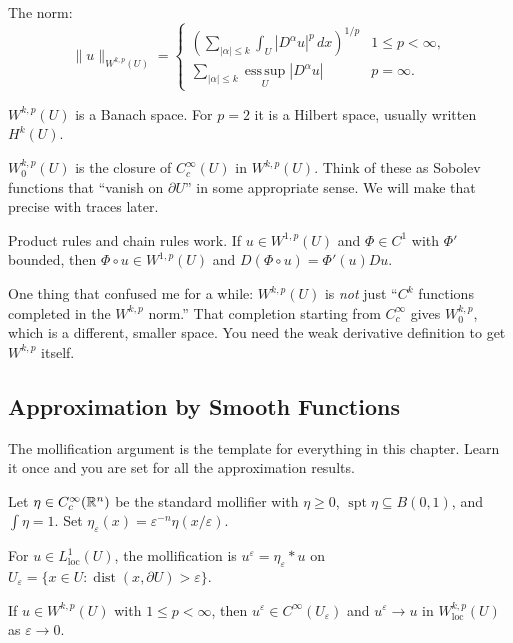 The norm:
\[
    \|u\|_{W^{k,p}(U)} =
    \begin{cases}
        \displaystyle\left( \sum_{|\alpha| \leq k} \int_U |D^\alpha u|^p \, dx \right)^{1/p} & 1 \leq p < \infty, \\[8pt]
        \displaystyle\sum_{|\alpha| \leq k} \operatorname*{ess\,sup}_U |D^\alpha u| & p = \infty.
    \end{cases}
\]

$W^{k,p}(U)$ is a Banach space. For $p = 2$ it is a Hilbert space, usually written $H^k(U)$.

$W^{k,p}_0(U)$ is the closure of $C^\infty_c(U)$ in $W^{k,p}(U)$. Think of these as Sobolev functions that ``vanish on $\partial U$'' in some appropriate sense. We will make that precise with traces later.

Product rules and chain rules work. If $u \in W^{1,p}(U)$ and $\Phi \in C^1$ with $\Phi'$ bounded, then $\Phi \circ u \in W^{1,p}(U)$ and $D(\Phi \circ u) = \Phi'(u) Du$.

One thing that confused me for a while: $W^{k,p}(U)$ is \emph{not} just ``$C^k$ functions completed in the $W^{k,p}$ norm.'' That completion starting from $C^\infty_c$ gives $W^{k,p}_0$, which is a different, smaller space. You need the weak derivative definition to get $W^{k,p}$ itself.


\subsection{Approximation by Smooth Functions}

The mollification argument is the template for everything in this chapter. Learn it once and you are set for all the approximation results.

\begin{definition}[Mollifier]
Let $\eta \in C^\infty_c(\mathbb{R}^n)$ be the standard mollifier with $\eta \geq 0$, $\operatorname{spt} \eta \subseteq B(0,1)$, and $\int \eta = 1$. Set $\eta_\varepsilon(x) = \varepsilon^{-n} \eta(x/\varepsilon)$.
\end{definition}

For $u \in L^1_{\mathrm{loc}}(U)$, the mollification is $u^\varepsilon = \eta_\varepsilon * u$ on $U_\varepsilon = \{x \in U : \operatorname{dist}(x, \partial U) > \varepsilon\}$.

\begin{theorem}
\label{thm:local-approx}
If $u \in W^{k,p}(U)$ with $1 \leq p < \infty$, then $u^\varepsilon \in C^\infty(U_\varepsilon)$ and $u^\varepsilon \to u$ in $W^{k,p}_{\mathrm{loc}}(U)$ as $\varepsilon \to 0$.
\end{theorem}

